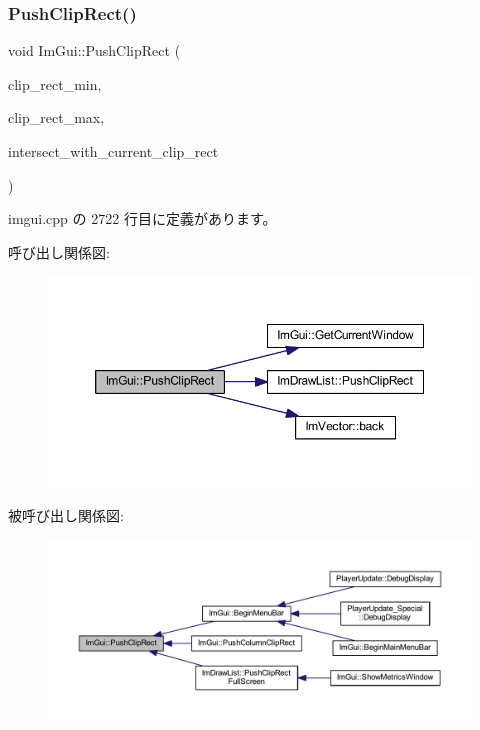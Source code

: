 \subsubsection{\texorpdfstring{Push\+Clip\+Rect()}{PushClipRect()}}
{\footnotesize\ttfamily void Im\+Gui\+::\+Push\+Clip\+Rect (\begin{DoxyParamCaption}\item[{const \mbox{\hyperlink{struct_im_vec2}{Im\+Vec2}} \&}]{clip\+\_\+rect\+\_\+min,  }\item[{const \mbox{\hyperlink{struct_im_vec2}{Im\+Vec2}} \&}]{clip\+\_\+rect\+\_\+max,  }\item[{bool}]{intersect\+\_\+with\+\_\+current\+\_\+clip\+\_\+rect }\end{DoxyParamCaption})}



 imgui.\+cpp の 2722 行目に定義があります。

呼び出し関係図\+:\nopagebreak
\begin{figure}[H]
\begin{center}
\leavevmode
\includegraphics[width=350pt]{namespace_im_gui_a11c8bd8676e1281e15b24c9615b6904a_cgraph}
\end{center}
\end{figure}
被呼び出し関係図\+:\nopagebreak
\begin{figure}[H]
\begin{center}
\leavevmode
\includegraphics[width=350pt]{namespace_im_gui_a11c8bd8676e1281e15b24c9615b6904a_icgraph}
\end{center}
\end{figure}
\mbox{\label{namespace_im_gui_abb20c9f8365cab62d9394ebb1dd5d769}} 

